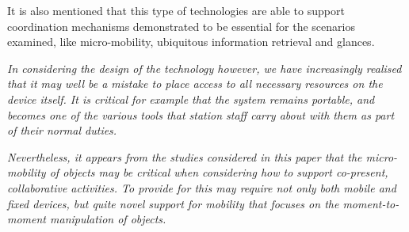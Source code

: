 It is also mentioned that this type of technologies are able to support coordination mechanisms demonstrated to be essential for the scenarios examined, like micro-mobility, ubiquitous information retrieval and glances.

\textit{
In considering the design of the technology however, we have increasingly realised that it may well be a mistake to place access to all necessary resources on the device itself. It is critical for example that the system remains portable, and becomes one of the various tools that station staff carry about with them as part of their normal duties.}

\textit{Nevertheless, it appears from the studies considered in this paper that the micro-mobility of objects may be critical when considering how to support co-present, collaborative activities. To provide for this may require not only both mobile and fixed devices, but quite novel support for mobility that focuses on the moment-to-moment manipulation of objects.}

